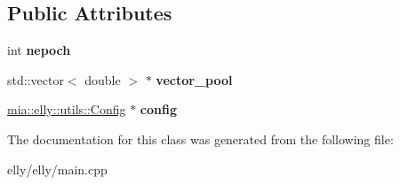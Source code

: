 \subsection*{Public Attributes}
\begin{DoxyCompactItemize}
\item 
\hypertarget{classmia_1_1elly_1_1_elly_a10d33c83a306c678d2f97afec4a7565e}{int {\bfseries nepoch}}\label{classmia_1_1elly_1_1_elly_a10d33c83a306c678d2f97afec4a7565e}

\item 
\hypertarget{classmia_1_1elly_1_1_elly_a70d6c80bb20a710991443696e53b6570}{std\-::vector$<$ double $>$ $\ast$ {\bfseries vector\-\_\-pool}}\label{classmia_1_1elly_1_1_elly_a70d6c80bb20a710991443696e53b6570}

\item 
\hypertarget{classmia_1_1elly_1_1_elly_a47a74ba9f8cd11ef0cf7e0aba883e6d2}{\hyperlink{classmia_1_1elly_1_1utils_1_1_config}{mia\-::elly\-::utils\-::\-Config} $\ast$ {\bfseries config}}\label{classmia_1_1elly_1_1_elly_a47a74ba9f8cd11ef0cf7e0aba883e6d2}

\end{DoxyCompactItemize}


The documentation for this class was generated from the following file\-:\begin{DoxyCompactItemize}
\item 
elly/elly/main.\-cpp\end{DoxyCompactItemize}
